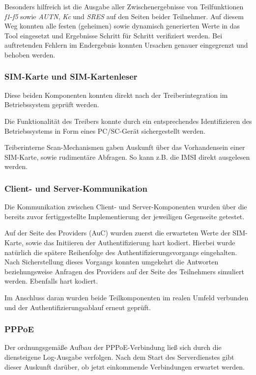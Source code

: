 		Besonders hilfreich ist die Ausgabe aller Zwischenergebnisse von Teilfunktionen
		\textit{f1}-\textit{f5} sowie \textit{AUTN}, \textit{Kc} und \textit{SRES} auf
		den Seiten beider Teilnehmer. Auf diesem Weg konnten alle festen (geheimen) sowie
		dynamisch generierten Werte in das Tool eingesetzt und Ergebnisse Schritt für
		Schritt verifiziert werden. Bei auftretenden Fehlern im Endergebnis konnten Ursachen
		genauer eingegrenzt und behoben werden.

		\subsubsection[SIM-Karte und SIM-Kartenleser (Schenkel)]{SIM-Karte und SIM-Kartenleser}
		Diese beiden Komponenten konnten direkt nach der Treiberintegration im Betriebssystem
		geprüft werden.

		Die Funktionalität des Treibers konnte durch ein entsprechendes Identifizieren des
		Betriebssystems in Form eines PC/SC-Gerät sichergestellt werden.

		Teiberinterne Scan-Mechanismen gaben Auskunft über das Vorhandensein einer SIM-Karte,
		sowie rudimentäre Abfragen. So kann z.B. die IMSI direkt ausgelesen werden.

		\subsubsection[Client- und Server-Kommunikation (Schenkel)]{Client- und Server-Kommunikation}
		Die Kommunikation zwischen Client- und Server-Komponenten wurden über die bereits zuvor
		fertiggestellte Implementierung der jeweiligen Gegenseite getestet.

		Auf der Seite des Providers (AuC) wurden zuerst die erwarteten Werte der SIM-Karte, sowie
		das Initiieren der Authentifizierung hart kodiert. Hierbei wurde natürlich die spätere
		Reihenfolge des Authentifizierungsvorgangs eingehalten. Nach Sicherstellung dieses Vorgangs
		konnten umgekehrt die Antworten beziehungsweise Anfragen des Providers auf der Seite des Teilnehmers
		simuliert werden. Ebenfalls hart kodiert.

		Im Anschluss daran wurden beide Teilkomponenten im realen Umfeld verbunden und der
		Authentifizierungsablauf erneut geprüft.

		\subsubsection[PPPoE (Schenkel)]{PPPoE}
		Der ordnungsgemäße Aufbau der PPPoE-Verbindung ließ sich durch die diensteigene
		Log-Ausgabe verfolgen. Nach dem Start des Serverdienstes gibt dieser Auskunft
		darüber, ob jetzt einkommende Verbindungen erwartet werden.


